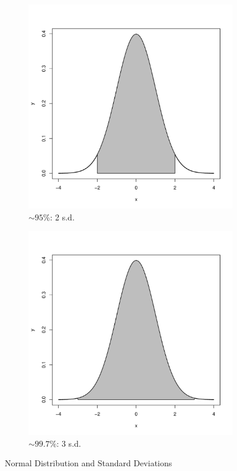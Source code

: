 \documentclass[11pt,openany]{book}\usepackage[]{graphicx}\usepackage[]{color}
\begin{document}
{\begin{figure}
\begin{subfigure}[b]{0.4\textwidth}
                \includegraphics[width=\textwidth]{05_Inference/normal95.pdf}
                \caption{$\sim 95\%$: 2 s.d.  \label{fig:norm95}}
        \end{subfigure}
        \begin{subfigure}[b]{0.4\textwidth}
                \centering
                \includegraphics[width=\textwidth]{05_Inference/normal99.pdf}
                \caption{$\sim 99.7\%$: 3 s.d. \label{fig:norm99}}
        \end{subfigure}
        \caption{Normal Distribution and Standard Deviations \label{fig:norm}}
\end{figure}

}
\end{document}
